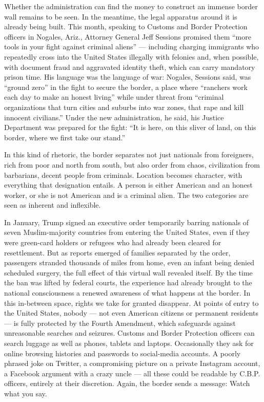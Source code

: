 Whether the administration can find the money to construct an immense
border wall remains to be seen. In the meantime, the legal apparatus
around it is already being built. This month, speaking to Customs and
Border Protection officers in Nogales, Ariz., Attorney General Jeff
Sessions promised them ``more tools in your fight against criminal
aliens'' --- including charging immigrants who repeatedly cross into the
United States illegally with felonies and, when possible, with document
fraud and aggravated identity theft, which can carry mandatory prison
time. His language was the language of war: Nogales, Sessions said, was
``ground zero'' in the fight to secure the border, a place where
``ranchers work each day to make an honest living'' while under threat
from ``criminal organizations that turn cities and suburbs into war
zones, that rape and kill innocent civilians.'' Under the new
administration, he said, his Justice Department was prepared for the
fight: ``It is here, on this sliver of land, on this border, where we
first take our stand.''

In this kind of rhetoric, the border separates not just nationals from
foreigners, rich from poor and north from south, but also order from
chaos, civilization from barbarians, decent people from criminals.
Location becomes character, with everything that designation entails. A
person is either American and an honest worker, or she is not American
and is a criminal alien. The two categories are seen as inherent and
inflexible.

In January, Trump signed an executive order temporarily barring
nationals of seven Muslim-majority countries from entering the United
States, even if they were green-card holders or refugees who had already
been cleared for resettlement. But as reports emerged of families
separated by the order, passengers stranded thousands of miles from
home, even an infant being denied scheduled surgery, the full effect of
this virtual wall revealed itself. By the time the ban was lifted by
federal courts, the experience had already brought to the national
consciousness a renewed awareness of what happens at the border. In this
in-between space, rights we take for granted disappear. At points of
entry to the United States, nobody --- not even American citizens or
permanent residents --- is fully protected by the Fourth Amendment,
which safeguards against unreasonable searches and seizures. Customs and
Border Protection officers can search luggage as well as phones, tablets
and laptops. Occasionally they ask for online browsing histories and
passwords to social-media accounts. A poorly phrased joke on Twitter, a
compromising picture on a private Instagram account, a Facebook argument
with a crazy uncle --- all these could be readable by C.B.P. officers,
entirely at their discretion. Again, the border sends a message: Watch
what you say.

